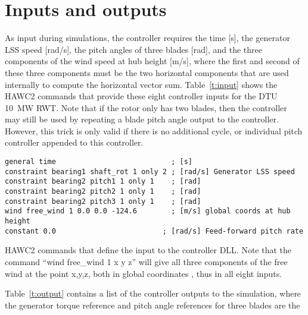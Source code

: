 \section{Inputs and outputs}

As input during simulations, the controller requires the time [s], the generator LSS speed [rad/s], the pitch angles of three blades [rad], and the three components of the wind speed at hub height [m/s], where the first and second of these three components must be the two horizontal components that are used internally to compute the horizontal vector sum. Table~\ref{t:input} shows the HAWC2 commands that provide these eight controller inputs for the DTU 10~MW RWT. Note that if the rotor only has two blades, then the controller may still be used by repeating a blade pitch angle output to the controller. However, this trick is only valid if there is no additional cycle, or individual pitch controller appended to this controller.

\begin{table}[t]
\center
\begin{verbatim}
general time                           ; [s]
constraint bearing1 shaft_rot 1 only 2 ; [rad/s] Generator LSS speed
constraint bearing2 pitch1 1 only 1    ; [rad]
constraint bearing2 pitch2 1 only 1    ; [rad]
constraint bearing2 pitch3 1 only 1    ; [rad]
wind free_wind 1 0.0 0.0 -124.6        ; [m/s] global coords at hub height
constant 0.0                         ; [rad/s] Feed-forward pitch rate
\end{verbatim}
\caption{HAWC2 commands that define the input to the controller DLL. Note that the command ``wind free\_wind 1 x y z'' will give all three components of the free wind at the point x,y,z, both in global coordinates \cite{Larsen12}, thus in all eight inputs. \label{t:input}}
\end{table}

Table~\ref{t:output} contains a list of the controller outputs to the simulation, where the generator torque reference and pitch angle references for three blades are the

